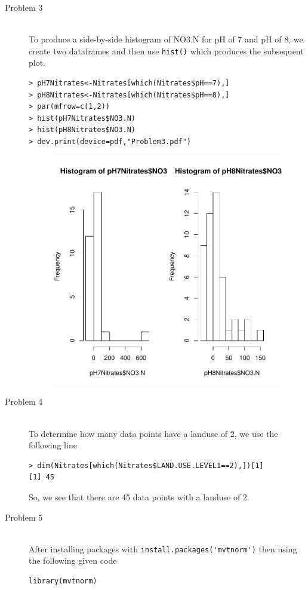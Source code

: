 \documentclass[10pt]{article}
\begin{document}
\begin{description}
\item[Problem 3]\hfill\\
To produce a side-by-side histogram of NO3.N for pH of 7 and pH of 8, we create two dataframes and then use \verb+hist()+ which produces the subsequent plot.
\begin{lstlisting}[frame=trBL]
> pH7Nitrates<-Nitrates[which(Nitrates$pH==7),]
> pH8Nitrates<-Nitrates[which(Nitrates$pH==8),]
> par(mfrow=c(1,2))
> hist(pH7Nitrates$NO3.N)
> hist(pH8Nitrates$NO3.N)
> dev.print(device=pdf,"Problem3.pdf")
\end{lstlisting}
\begin{figure}[ht!]
\centering
\includegraphics[width=15cm]{../Problem3.pdf}
\end{figure}

\item[Problem 4] \hfill\\
To determine how many data points have a landuse of 2, we use the following line
\begin{lstlisting}[frame=trBL]
> dim(Nitrates[which(Nitrates$LAND.USE.LEVEL1==2),])[1]
[1] 45
\end{lstlisting}
So, we see that there are 45 data points with a landuse of 2.

\item[Problem 5]\hfill\\
After installing packages with \verb+install.packages('mvtnorm')+ then using the following given code
\begin{lstlisting}[frame=trBL]
 library(mvtnorm)


\end{lstlisting}
\end{description}
\end{document}
